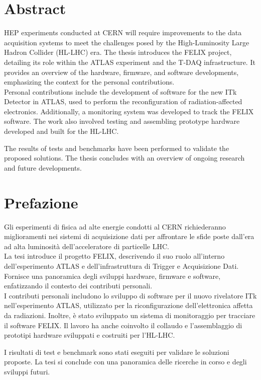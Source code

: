 \chapter*{Abstract}

\acl{HEP} experiments conducted at \acs{CERN} will require improvements to the data acquisition systems to meet the challenges posed by the High-Luminosity Large Hadron Collider (\acs{HL-LHC}) era. The thesis introduces the \acs{FELIX} project, detailing its role within the \acs{ATLAS} experiment and the \acl{T-DAQ} infrastructure. It provides an overview of the hardware, firmware, and software developments, emphasizing the context for the personal contributions.\\
Personal contributions include the development of software for the new \acl{ITk} Detector in \acs{ATLAS}, used to perform the reconfiguration of radiation-affected electronics. Additionally, a monitoring system was developed to track the \acs{FELIX} software. The work also involved testing and assembling prototype hardware developed and built for the \acl{HL-LHC}.

The results of tests and benchmarks have been performed to validate the proposed solutions. The thesis concludes with an overview of ongoing research and future developments.

\clearpage
\chapter*{Prefazione}

Gli esperimenti di fisica ad alte energie condotti al \acs{CERN} richiederanno miglioramenti nei sistemi di acquisizione dati per affrontare le sfide poste dall'era ad alta luminosità dell'acceleratore di particelle \acs{LHC}.\\
La tesi introduce il progetto \acs{FELIX}, descrivendo il suo ruolo all'interno dell'esperimento \acs{ATLAS} e dell'infrastruttura di Trigger e Acquisizione Dati. Fornisce una panoramica degli sviluppi hardware, firmware e software, enfatizzando il contesto dei contributi personali.\\
I contributi personali includono lo sviluppo di software per il nuovo rivelatore \acl{ITk} nell'esperimento \acs{ATLAS}, utilizzato per la riconfigurazione dell'elettronica affetta da radiazioni. Inoltre, è stato sviluppato un sistema di monitoraggio per tracciare il software \acs{FELIX}. Il lavoro ha anche coinvolto il collaudo e l'assemblaggio di prototipi hardware sviluppati e costruiti per l'\acl{HL-LHC}.

I risultati di test e benchmark sono stati eseguiti per validare le soluzioni proposte. La tesi si conclude con una panoramica delle ricerche in corso e degli sviluppi futuri.